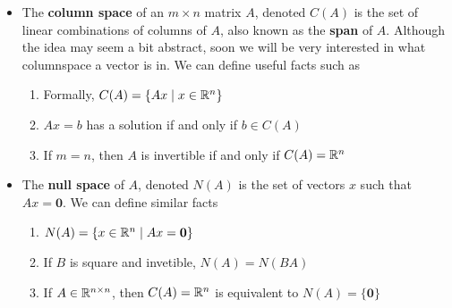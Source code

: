 \documentclass[11pt]{article}
\begin{document}
		\begin{ideabox}\quad
			\begin{itemize}
			    
		    
\item The \textbf{column space} of an $m \times n$ matrix $A$, denoted $C(A)$ is the set of linear combinations of columns of $A$, also known as the \textbf{span} of $A$. Although the idea may seem a bit abstract, soon we will be very interested in what columnspace a vector is in. We can define useful facts such as
	\begin{enumerate}
		\item Formally, $C(A) = \{Ax \mid x \in \mathbb{R}^{n}\}$ 
		\item $Ax=b$ has a solution if and only if $b \in C(A)$
		\item If $m=n$, then $A$ is invertible if and only if $C(A) = \mathbb{R} ^{n}$
	\end{enumerate}
\item The \textbf{null space} of $A$, denoted $N(A)$ is the set of vectors $x$ such that $Ax = \mathbf{0}$. We can define similar facts
	\begin{enumerate}
		\item $N(A) = \{ x \in \mathbb{R}^{n} \mid Ax = \bm{0} \}$
		\item If $B$ is square and invetible, $N(A)=N(BA)$
		\item If $A \in \mathbb{R}^{n \times n}$, then $C(A) = \mathbb{R}^n$ is equivalent to $N(A) = \{\bm{0}\}$
	\end{enumerate}
\end{itemize}
		\end{ideabox}
\end{document}
